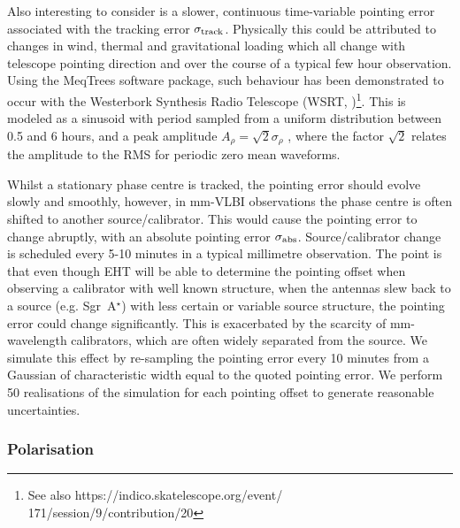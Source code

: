 Also interesting to consider is a slower, continuous time-variable pointing error associated with the tracking error $\sigma_{\rm track}$. Physically this could be attributed to changes in wind, thermal and gravitational loading which all change with telescope pointing direction and over the course of a typical few hour observation. Using the MeqTrees software package, such behaviour has been demonstrated to occur with the Westerbork Synthesis Radio Telescope (WSRT, \cite{Smirnov_2011c})\footnote{See also https://indico.skatelescope.org/event/\\171/session/9/contribution/20}. This is modeled as a sinusoid with period sampled from a uniform distribution between 0.5 and 6 hours, and a peak amplitude $A_{\rho} = \sqrt{2} \sigma_{\rho}$ , where the factor $\sqrt{2}$ relates the amplitude to the RMS for periodic zero mean waveforms. 


Whilst a stationary phase centre is tracked, the pointing error should evolve slowly and smoothly, however, in mm-VLBI observations the phase centre is often shifted to another source/calibrator. This would cause the pointing error to change abruptly, with an absolute pointing error $\sigma_{\rm abs}$. Source/calibrator change is scheduled every 5-10 minutes in a typical millimetre observation. The point is that even though EHT will be able to determine the pointing offset when observing a calibrator with well known structure, when the antennas slew back to a source (e.g. Sgr~A$^\star$) with less certain or variable source structure, the pointing error could change significantly. This is exacerbated by the scarcity of mm-wavelength calibrators, which are often widely separated from the source. We simulate this effect by re-sampling the pointing error every 10 minutes from a Gaussian of characteristic width equal to the quoted pointing error. We perform 50 realisations of the simulation for each pointing offset to generate reasonable uncertainties.




\subsubsection{Polarisation}



